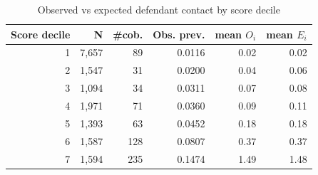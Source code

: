 \begin{table}[htbp]\centering
\caption{Observed vs expected defendant contact by score decile}
\label{tab:obs_exp_bins}
\begin{tabular}{rrrrrr}\hline
Score decile & N & \#cob. & Obs. prev. & mean $O_i$ & mean $E_i$ \\\hline
1 & 7,657 & 89 & 0.0116 & 0.02 & 0.02 \\
2 & 1,547 & 31 & 0.0200 & 0.04 & 0.06 \\
3 & 1,094 & 34 & 0.0311 & 0.07 & 0.08 \\
4 & 1,971 & 71 & 0.0360 & 0.09 & 0.11 \\
5 & 1,393 & 63 & 0.0452 & 0.18 & 0.18 \\
6 & 1,587 & 128 & 0.0807 & 0.37 & 0.37 \\
7 & 1,594 & 235 & 0.1474 & 1.49 & 1.48 \\
\hline\end{tabular}\end{table}
